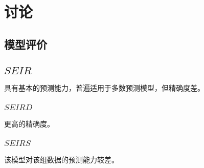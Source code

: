 \section{讨论}
\subsection{模型评价}
\subsection{$SEIR$}
具有基本的预测能力，普遍适用于多数预测模型，但精确度差。
\subsubsection{$SEIRD$}
更高的精确度。
\subsubsection{$SEIRS$}
该模型对该组数据的预测能力较差。
